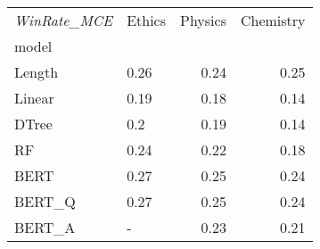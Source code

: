 \begin{tabular}{llrr}
\toprule
\textit{WinRate\_MCE} & Ethics &  Physics &  Chemistry \\
model  &        &          &            \\
\midrule
Length &   0.26 &     0.24 &       0.25 \\
Linear &   0.19 &     0.18 &       0.14 \\
DTree  &    0.2 &     0.19 &       0.14 \\
RF     &   0.24 &     0.22 &       0.18 \\
BERT   &   0.27 &     0.25 &       0.24 \\
BERT\_Q &   0.27 &     0.25 &       0.24 \\
BERT\_A &      - &     0.23 &       0.21 \\
\bottomrule
\end{tabular}
